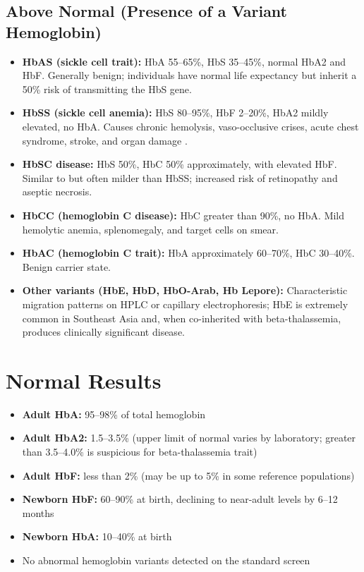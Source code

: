 \subsection*{Above Normal (Presence of a Variant Hemoglobin)}
\begin{itemize}
  \item \textbf{HbAS (sickle cell trait):} HbA 55--65\%, HbS 35--45\%, normal HbA2 and HbF. Generally benign; individuals have normal life expectancy but inherit a 50\% risk of transmitting the HbS gene.
  \item \textbf{HbSS (sickle cell anemia):} HbS 80--95\%, HbF 2--20\%, HbA2 mildly elevated, no HbA. Causes chronic hemolysis, vaso-occlusive crises, acute chest syndrome, stroke, and organ damage \cite{bunn1997pathogenesis}.
  \item \textbf{HbSC disease:} HbS 50\%, HbC 50\% approximately, with elevated HbF. Similar to but often milder than HbSS; increased risk of retinopathy and aseptic necrosis.
  \item \textbf{HbCC (hemoglobin C disease):} HbC greater than 90\%, no HbA. Mild hemolytic anemia, splenomegaly, and target cells on smear.
  \item \textbf{HbAC (hemoglobin C trait):} HbA approximately 60--70\%, HbC 30--40\%. Benign carrier state.
  \item \textbf{Other variants (HbE, HbD, HbO-Arab, Hb Lepore):} Characteristic migration patterns on HPLC or capillary electrophoresis; HbE is extremely common in Southeast Asia and, when co-inherited with beta-thalassemia, produces clinically significant disease.
\end{itemize}

\section*{Normal Results}
\begin{itemize}
  \item \textbf{Adult HbA:} 95--98\% of total hemoglobin
  \item \textbf{Adult HbA2:} 1.5--3.5\% (upper limit of normal varies by laboratory; greater than 3.5--4.0\% is suspicious for beta-thalassemia trait)
  \item \textbf{Adult HbF:} less than 2\% (may be up to 5\% in some reference populations)
  \item \textbf{Newborn HbF:} 60--90\% at birth, declining to near-adult levels by 6--12 months
  \item \textbf{Newborn HbA:} 10--40\% at birth
  \item No abnormal hemoglobin variants detected on the standard screen
\end{itemize}

